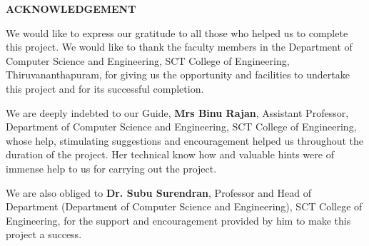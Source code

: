 \begin{center}	
	\textbf{\Large ACKNOWLEDGEMENT}\\
\end{center}
\vspace{2cm}
\par
We would like to express our gratitude to all those who helped us to complete this
project. We would like to thank the faculty members in the Department of Computer
Science and Engineering, SCT College of Engineering, Thiruvananthapuram, for giving
us the opportunity and facilities to undertake this project and for its successful
completion.
\par
We are deeply indebted to our Guide, \textbf{Mrs Binu Rajan}, Assistant Professor,
Department of Computer Science and Engineering, SCT College of Engineering, whose
help, stimulating suggestions and encouragement helped us throughout the duration of
the project. Her technical know how and valuable hints were of immense help to us for
carrying out the project.
\par
We are also obliged to \textbf{ Dr. Subu Surendran}, Professor and Head of Department
(Department of Computer Science and Engineering), SCT College of Engineering, for the
support and encouragement provided by him to make this project a success.

\newpage


